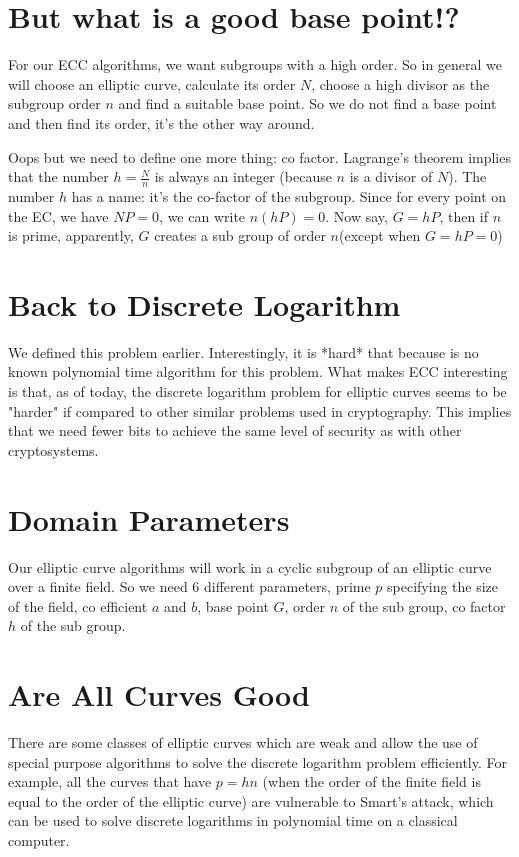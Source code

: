 \documentclass[12pt,letterpaper]{article}
\begin{document}
\section{But what is a good base point!?}
For our ECC algorithms, we want subgroups with a high order. So in general we will choose an elliptic curve, calculate its order $N$, choose a high divisor as the subgroup order $n$ and find a suitable base point. So we do not find a base point and then find its order, it's the other way around.

Oops but we need to define one more thing: co factor. Lagrange's theorem implies that the number $h=\frac{N}{n}$ is always an integer (because $n$ is a divisor of $N$). The number $h$ has a name: it's the co-factor of the subgroup.
Since for every point on the EC, we have $NP=0$, we can write $n(hP)=0$. Now say, $G=hP$, then if $n$ is prime, apparently, $G$ creates a sub group of order $n$(except when $G=hP=0$)
\section{Back to Discrete Logarithm}
We defined this problem earlier. Interestingly, it is *hard* that because is no known polynomial time algorithm for this problem. What makes ECC interesting is that, as of today, the discrete logarithm problem for elliptic curves seems to be "harder" if compared to other similar problems used in cryptography. This implies that we need fewer bits to achieve the same level of security as with other cryptosystems.

\section{Domain Parameters}
Our elliptic curve algorithms will work in a cyclic subgroup of an elliptic curve over a finite field. So we need $6$ different parameters, prime $p$ specifying the size of the field, co efficient $a$ and $b$, base point $G$, order $n$ of the sub group, co factor $h$ of the sub group.
\section{Are All Curves Good}
There are some classes of elliptic curves which are weak and allow the use of special purpose algorithms to solve the discrete logarithm problem efficiently. For example, all the curves that have $p=hn$ (when the order of the finite field is equal to the order of the elliptic curve) are vulnerable to Smart's attack, which can be used to solve discrete logarithms in polynomial time on a classical computer.
\end{document}
